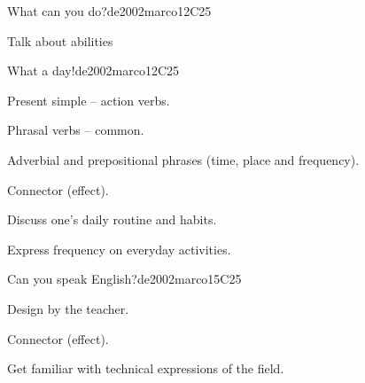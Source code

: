 \begin{syllabus}
\begin{unit}{What can you do?}{}{de2002marco}{12}{C25}
   \begin{learningoutcomes}
      \item Talk about abilities
   \end{learningoutcomes}
\end{unit}

\begin{unit}{What a day!}{}{de2002marco}{12}{C25}
   \begin{topics}
      \item Present simple – action verbs.
      \item Phrasal verbs – common.
      \item Adverbial and prepositional phrases (time, place and frequency).
      \item Connector (effect).
   \end{topics}

   \begin{learningoutcomes}
      \item Discuss one’s daily routine and habits.
      \item Express frequency on everyday activities.
   \end{learningoutcomes}
\end{unit}

\begin{unit}{Can you speak English?}{}{de2002marco}{15}{C25}
   \begin{topics}
      \item Design by the teacher.
      \item Connector (effect).
   \end{topics}

   \begin{learningoutcomes}
      \item Get familiar with technical expressions of the field.
   \end{learningoutcomes}
\end{unit}

\begin{coursebibliography}
\end{coursebibliography}

\end{syllabus}
%
